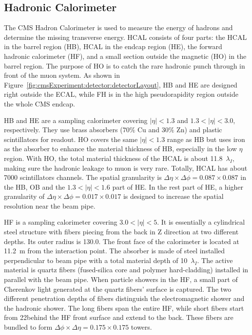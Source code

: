 \subsection{Hadronic Calorimeter}
The CMS Hadron Calorimeter \cite{cms:hcalTdrCMS:1997xji} is used to measure the energy of hadrons and determine the missing transverse energy. HCAL consists of four parts: the HCAL in the barrel region (HB), HCAL in the endcap region (HE), the forward hadronic calorimeter (HF), and a small section outside the magnetic (HO) in the barrel region. The purpose of HO is to catch the rare hadronic punch through in front of the muon system. As shown in Figure~\ref{fig:cmsExperiment:detector:detectorLayout}, HB and HE are designed right outside the ECAL, while FH is in the high pseudorapidity region outside the whole CMS endcap.

HB and HE are a sampling calorimeter covering $|\eta|< 1.3$ and $1.3<|\eta|< 3.0$, respectively. They use brass absorbers ($70\%$ Cu and $30\%$ Zn) and plastic scintillators for readout. HO covers the same $|\eta|< 1.3$ range as HB but uses iron as the absorber to enhance the material thickness of HB, especially in the low $\eta$ region. With HO, the total material thickness of the HCAL is about 11.8~$\lambda_I$, making sure the hadronic leakage to muon is very rare. Totally, HCAL has about 7000 scintillators channels. The spatial granularity is $\Delta \eta \times \Delta \phi = 0.087 \times 0.087$ in the HB, OB and the $1.3<|\eta|< 1.6$ part of HE. In the rest part of HE, a higher granularity of $\Delta \eta \times \Delta \phi = 0.017 \times 0.017$ is designed to increase the spatial resolution near the beam pipe.

HF is a sampling calorimeter covering $3.0 < |\eta| < 5$. It is essentially a cylindrical steel structure with fibers piecing from the back in Z direction at two different depths. Its outer radius is 130.0\cm. The front face of the calorimeter is located at 11.2~m from the interaction point. The absorber is made of steel installed perpendicular to beam pipe with a total material depth of 10~$\lambda_I$. The active material is quartz fibers (fused-silica core and polymer hard-cladding) installed in parallel with the beam pipe. When particle showers in the HF, a small part of Cherenkov light generated at the quartz fibers' surface is captured. The two different penetration depths of fibers distinguish the electromagnetic shower and the hadronic shower. The long fibers span the entire HF, while short fibers start from 22\cm behind the HF front surface and extend to the back. These fibers are bundled to form $\Delta \phi \times \Delta \eta = 0.175 \times 0.175$ towers. 


